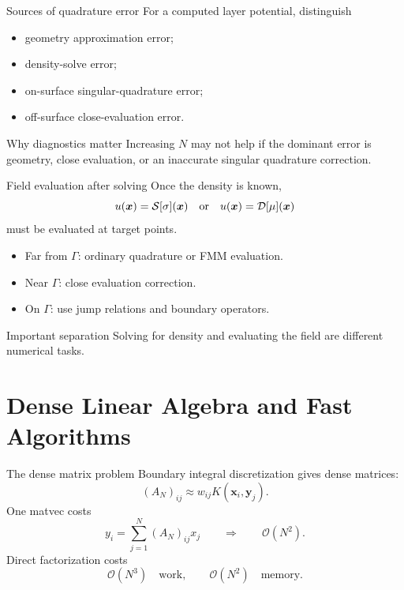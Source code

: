 \documentclass[aspectratio=169,11pt]{beamer}
\newcommand{\x}{\bm{x}}
\newcommand{\y}{\bm{y}}
\newcommand{\cO}{\mathcal{O}}
\begin{document}
\begin{frame}{Sources of quadrature error}
\small
For a computed layer potential, distinguish
\begin{itemize}
  \item geometry approximation error;
  \item density-solve error;
  \item on-surface singular-quadrature error;
  \item off-surface close-evaluation error.
\end{itemize}

\begin{block}{Why diagnostics matter}
Increasing $N$ may not help if the dominant error is geometry, close
evaluation, or an inaccurate singular quadrature correction.
\end{block}
\end{frame}

\begin{frame}{Field evaluation after solving}
\small
Once the density is known,
\[
  u(\x)=\Sop[\sigma](\x)\quad\text{or}\quad u(\x)=\Dop[\mu](\x)
\]
must be evaluated at target points.

\begin{itemize}
  \item Far from $\Gamma$: ordinary quadrature or FMM evaluation.
  \item Near $\Gamma$: close evaluation correction.
  \item On $\Gamma$: use jump relations and boundary operators.
\end{itemize}

\begin{block}{Important separation}
Solving for density and evaluating the field are different numerical tasks.
\end{block}
\end{frame}

\section{Dense Linear Algebra and Fast Algorithms}

\begin{frame}{The dense matrix problem}
\small
Boundary integral discretization gives dense matrices:
\[
  (A_N)_{ij}\approx w_{ij}K(\x_i,\y_j).
\]
One matvec costs
\[
  y_i=\sum_{j=1}^N (A_N)_{ij}x_j
  \qquad\Rightarrow\qquad
  \cO(N^2).
\]
Direct factorization costs
\[
  \cO(N^3)\quad\text{work},\qquad \cO(N^2)\quad\text{memory}.
\]
\end{frame}
\end{document}
